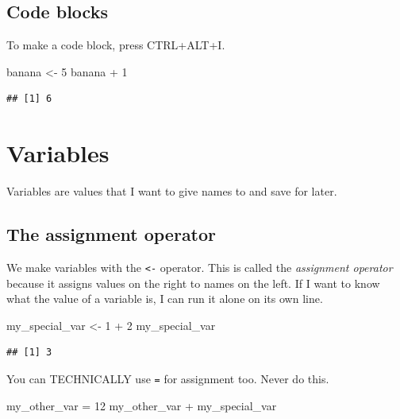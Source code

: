 \documentclass[
]{book}
\newenvironment{Shaded}{\begin{snugshade}}{\end{snugshade}}
\newcommand{\DecValTok}[1]{\textcolor[rgb]{0.00,0.00,0.81}{#1}}
\newcommand{\NormalTok}[1]{#1}
\newcommand{\OtherTok}[1]{\textcolor[rgb]{0.56,0.35,0.01}{#1}}
\newcommand{\SpecialCharTok}[1]{\textcolor[rgb]{0.00,0.00,0.00}{#1}}
\begin{document}
\hypertarget{code-blocks}{%
\subsection{Code blocks}\label{code-blocks}}

To make a code block, press CTRL+ALT+I.

\begin{Shaded}
\begin{Highlighting}[]
\NormalTok{banana }\OtherTok{\textless{}{-}} \DecValTok{5}
\NormalTok{banana }\SpecialCharTok{+} \DecValTok{1}
\end{Highlighting}
\end{Shaded}

\begin{verbatim}
## [1] 6
\end{verbatim}

\hypertarget{variables}{%
\section{Variables}\label{variables}}

Variables are values that I want to give names to and save for later.

\hypertarget{the-assignment-operator}{%
\subsection{The assignment operator}\label{the-assignment-operator}}

We make variables with the \texttt{\textless{}-} operator. This is called the \emph{assignment operator} because it assigns values on the right to names on the left. If I want to know what the value of a variable is, I can run it alone on its own line.

\begin{Shaded}
\begin{Highlighting}[]
\NormalTok{my\_special\_var }\OtherTok{\textless{}{-}} \DecValTok{1} \SpecialCharTok{+} \DecValTok{2}
\NormalTok{my\_special\_var}
\end{Highlighting}
\end{Shaded}

\begin{verbatim}
## [1] 3
\end{verbatim}

You can TECHNICALLY use \texttt{=} for assignment too. Never do this.

\begin{Shaded}
\begin{Highlighting}[]
\NormalTok{my\_other\_var }\OtherTok{=} \DecValTok{12}
\NormalTok{my\_other\_var }\SpecialCharTok{+}\NormalTok{ my\_special\_var}
\end{Highlighting}
\end{Shaded}
\end{document}
